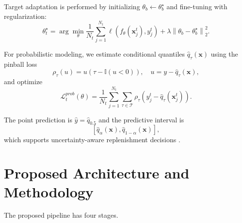 \documentclass[3p,times,procedia]{elsarticle}
\begin{document}
Target adaptation is performed by initializing $\theta_b \leftarrow \theta_b^{\star}$ and fine-tuning with regularization:
\begin{equation}
\theta_t^{\star} = \arg\min_{\theta}
\frac{1}{N_t}\sum_{j=1}^{N_t}\ell\left(f_{\theta}(\mathbf{x}_j^t), y_j^t\right)
+ \lambda \left\|\theta_b-\theta_b^{\star}\right\|_2^2.
\end{equation}

For probabilistic modeling, we estimate conditional quantiles $\hat{q}_{\tau}(\mathbf{x})$ using the pinball loss \cite{Koenker2005}
\begin{equation}
\rho_{\tau}(u) = u\left(\tau - \mathbb{I}(u<0)\right),
\quad u = y - \hat{q}_{\tau}(\mathbf{x}),
\end{equation}
and optimize
\begin{equation}
\mathcal{L}^{prob}_t(\theta) =
\frac{1}{N_t}\sum_{j=1}^{N_t}\sum_{\tau\in\mathcal{T}}
\rho_{\tau}\left(y_j^t-\hat{q}_{\tau}(\mathbf{x}_j^t)\right).
\end{equation}

The point prediction is $\hat{y}=\hat{q}_{0.5}$ and the predictive interval is
\begin{equation}
\left[\hat{q}_{\alpha}(\mathbf{x}),\hat{q}_{1-\alpha}(\mathbf{x})\right],
\end{equation}
which supports uncertainty-aware replenishment decisions \cite{Xu2019,Jiang2019}.

\begin{nomenclature}
\begin{deflist}[A]
\space\space{}
\space{}
     
\end{deflist}
\end{nomenclature}

\section{Proposed Architecture and Methodology}
The proposed pipeline has four stages.
\end{document}
